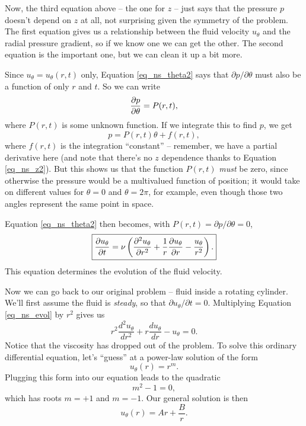 Now, the third equation above -- the one for $z$ -- just says that the pressure $p$ doesn't depend on $z$ at all, not surprising given the symmetry of the problem.  The first equation gives us a relationship between the fluid velocity $u_\theta$ and the radial pressure gradient, so if we know one we can get the other.  The second equation is the important one, but we can clean it up a bit more.  

Since $u_\theta = u_\theta(r, t)$ only, Equation \ref{eq_ns_theta2} says that $\partial p / \partial \theta$ must also be a function of only $r$ and $t$.  So we can write
\[
\frac{\partial {p}}{\partial {\theta}} = P(r, t),
\]
where $P(r, t)$ is some unknown function.  If we integrate this to find $p$, we get
\[
p = P(r, t) \theta + f(r, t),
\]
where $f(r, t)$ is the integration ``constant'' -- remember, we have a partial derivative here (and note that there's no $z$ dependence thanks to Equation \ref{eq_ns_z2}).  But this shows us that the function $P(r, t)$ \emph{must} be zero, since otherwise the pressure would be a multivalued function of position; it would take on different values for $\theta = 0$ and $\theta = 2 \pi$, for example, even though those two angles represent the same point in space.

Equation \ref{eq_ns_theta2} then becomes, with $P(r, t) = \partial p / \partial \theta = 0$, 
\begin{equation}
\label{eq_ns_evol}
\boxed{
\frac{\partial {u_\theta}}{\partial {t}} =  \nu \left( \frac{\partial^2 {u_\theta}}{\partial {r}^2} + \frac{1}{r} \frac{\partial {u_\theta}}{\partial {r}} - \frac{u_\theta}{r^2} \right).
}
\end{equation}
This equation determines the evolution of the fluid velocity.

Now we can go back to our original problem -- fluid inside a rotating cylinder.  We'll first assume the fluid is \emph{steady}, so that $\partial u_\theta / \partial t = 0$.  Multiplying Equation \ref{eq_ns_evol} by $r^2$ gives us
\begin{equation}
\label{eq_spin_diffeq}
r^2 \frac{d^2 u_\theta}{dr^2} + r \frac{d u_\theta}{dr} - u_\theta = 0.
\end{equation}
Notice that the viscosity has dropped out of the problem.  To solve this ordinary differential equation, let's ``guess'' at a power-law solution of the form
\[
u_\theta(r) = r^m.
\]
Plugging this form into our equation leads to the quadratic 
\[
m^2 -1 = 0,
\]
which has roots $m = +1$ and $m = -1$.  Our general solution is then
\begin{equation}
\label{eq_cyl_steady_gen_sol}
u_\theta (r) = Ar + \frac{B}{r}.
\end{equation}

